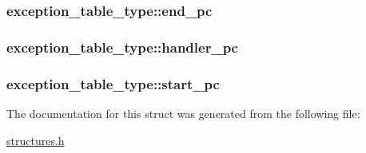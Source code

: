 \subsubsection[{\texorpdfstring{end\+\_\+pc}{end_pc}}]{ exception\+\_\+table\+\_\+type\+::end\+\_\+pc}\hypertarget{structexception__table__type_a796565865a227dc76b0dd7c78e3f8424}{}\label{structexception__table__type_a796565865a227dc76b0dd7c78e3f8424}
\subsubsection[{\texorpdfstring{handler\+\_\+pc}{handler_pc}}]{ exception\+\_\+table\+\_\+type\+::handler\+\_\+pc}\hypertarget{structexception__table__type_af1b56d902850a41f63b7271029946759}{}\label{structexception__table__type_af1b56d902850a41f63b7271029946759}
\subsubsection[{\texorpdfstring{start\+\_\+pc}{start_pc}}]{ exception\+\_\+table\+\_\+type\+::start\+\_\+pc}\hypertarget{structexception__table__type_a71cf8eaa3d06b89818100df6405b266d}{}\label{structexception__table__type_a71cf8eaa3d06b89818100df6405b266d}


The documentation for this struct was generated from the following file\+:\begin{DoxyCompactItemize}
\item 
\hyperlink{structures_8h}{structures.\+h}\end{DoxyCompactItemize}
